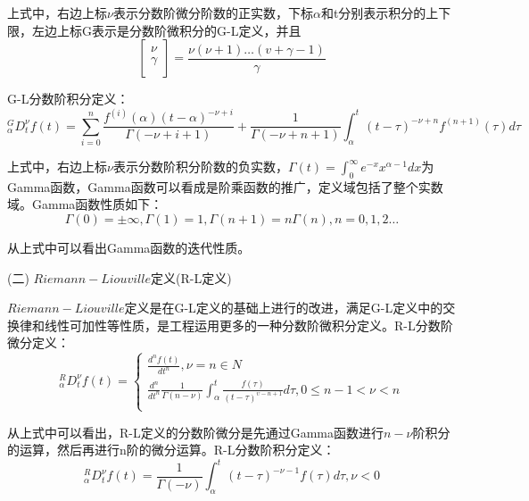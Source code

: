 上式中，右边上标$\nu $表示分数阶微分阶数的正实数，下标$\alpha $和t分别表示积分的上下限，左边上标G表示是分数阶微积分的G-L定义，并且
\begin{equation}
\left[ \begin{matrix}
   \nu   \\
   \gamma   \\
\end{matrix} \right]=\frac{\nu \left( \nu +1 \right)\ldots \left( v+\gamma -1 \right)}{\gamma }
\end{equation}

G-L分数阶积分定义：
\begin{equation}
{}_{\alpha }^{G}D_{t}^{\nu }f(t)=\sum\limits_{i=0}^{n}{\frac{{{f}^{\left( i \right)}}\left( \alpha  \right){{\left( t-\alpha  \right)}^{-\nu +i}}}{\Gamma \left( -\nu +i+1 \right)}+\frac{1}{\Gamma \left( -\nu +n+1 \right)}}\int_{\alpha }^{t}{{{\left( t-\tau  \right)}^{-\nu +n}}{{f}^{\left( n+1 \right)}}\left( \tau  \right)}d\tau 
\end{equation}

上式中，右边上标$\nu$表示分数阶积分阶数的负实数，$\Gamma \left( t \right)=\int_{0}^{\infty }{{{e}^{-x}}{{x}^{\alpha -1}}dx}$为Gamma函数，Gamma函数可以看成是阶乘函数的推广，定义域包括了整个实数域。Gamma函数性质如下：
\begin{equation}
\Gamma \left( 0 \right)=\pm \infty ,\Gamma \left( 1 \right)=1,\Gamma \left( n+1 \right)=n\Gamma \left( n \right),n=0,1,2\ldots 
\end{equation}

从上式中可以看出Gamma函数的迭代性质。

(二) $Riemann-Liouville$定义(R-L定义)

$Riemann-Liouville$定义是在G-L定义的基础上进行的改进，满足G-L定义中的交换律和线性可加性等性质，是工程运用更多的一种分数阶微积分定义。R-L分数阶微分定义：
\begin{equation}
{}_{\alpha }^{R}D_{t}^{\nu }f(t)=\left\{ \begin{matrix}
   \frac{{{d}^{n}}f\left( t \right)}{d{{t}^{n}}},\nu =n\in N  \\
   \frac{{{d}^{n}}}{d{{t}^{n}}}\frac{1}{\Gamma \left( n-\nu  \right)}\int_{\alpha }^{t}{\frac{f\left( \tau  \right)}{{{\left( t-\tau  \right)}^{\upsilon -n+1}}}d\tau ,0\le n-1<\nu <n}  \\
\end{matrix} \right.
\end{equation}

从上式中可以看出，R-L定义的分数阶微分是先通过Gamma函数进行$n-\nu $阶积分的运算，然后再进行n阶的微分运算。R-L分数阶积分定义：
\begin{equation}
{}_{\alpha }^{R}D_{t}^{\nu }f(t)=\frac{1}{\Gamma \left( -\nu  \right)}\int_{\alpha }^{t}{{{\left( t-\tau  \right)}^{-\nu -1}}f\left( \tau  \right)}d\tau ,\nu <0
\end{equation}

